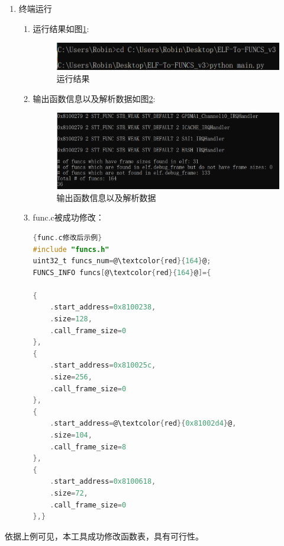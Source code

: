 \documentclass[UTF8,12pt,a4paper]{ctexart}
\numberwithin{figure}{section}
\begin{document}
\begin{enumerate}
\begin{enumerate}
          \end{enumerate}
    \item 终端运行
          \begin{enumerate}
              \item 运行结果如图\ref{yx}:
                    \begin{figure}[H]
                        \centering
                        \includegraphics[scale=0.5]{graph/zhongduanjieguo.png}
                        \caption{运行结果}
                        \label{yx}
                    \end{figure}
              \item 输出函数信息以及解析数据如图\ref{sc}:
                    \begin{figure}[H]
                        \centering
                        \includegraphics[scale=0.4]{graph/shuchujieguo.png}
                        \caption{输出函数信息以及解析数据}
                        \label{sc}
                    \end{figure}
              \item func.c被成功修改：
                    \begin{lstlisting}[language=C]{func.c修改后示例}
#include "funcs.h"
uint32_t funcs_num=@\textcolor{red}{164}@;
FUNCS_INFO funcs[@\textcolor{red}{164}@]={
    
{
    .start_address=0x8100238,
    .size=128,
    .call_frame_size=0
},
{
    .start_address=0x810025c,
    .size=256,
    .call_frame_size=0
},
{
    .start_address=@\textcolor{red}{0x81002d4}@,
    .size=104,
    .call_frame_size=8
},
{
    .start_address=0x8100618,
    .size=72,
    .call_frame_size=0
},}\end{lstlisting}
     \end{enumerate}
\end{enumerate}
\par 依据上例可见，本工具成功修改函数表，具有可行性。
\end{document}
